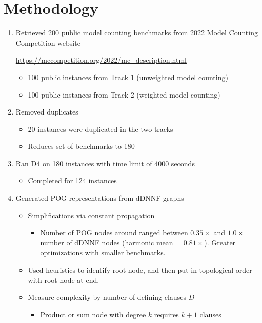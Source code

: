 \documentclass[letterpaper,USenglish,cleveref, autoref, thm-restate]{lipics-v2021}
\begin{document}
\section*{Methodology}
\begin{enumerate}
   \item Retrieved 200 public model counting benchmarks from 2022 Model Counting Competition website
     \begin{center}
       \url{https://mccompetition.org/2022/mc_description.html}
     \end{center}
     \begin{itemize}
     \item 100 public instances from Track 1 (unweighted model counting)
     \item 100 public instances from Track 2 (weighted model counting)
     \end{itemize}
   \item Removed duplicates
     \begin{itemize}
    \item  20 instances were duplicated in the two tracks
     \item Reduces set of benchmarks to 180
     \end{itemize}
   \item Ran D4 on 180 instances with time limit of 4000 seconds
     \begin{itemize}
     \item Completed for 124 instances
     \end{itemize}
   \item Generated POG representations from dDNNF graphs
     \begin{itemize}
     \item Simplifications via constant propagation
       \begin{itemize}
       \item Number of POG nodes around ranged between $0.35\times$
         and $1.0\times$ number of dDNNF nodes (harmonic mean =
         $0.81\times$).  Greater optimizations with smaller
         benchmarks.
       \end{itemize}
     \item Used heuristics to identify root node, and then put in topological order with root node at end.
     \item Measure complexity by number of defining clauses $D$
       \begin{itemize}
       \item Product or sum node with degree $k$ requires $k+1$ clauses

\end{itemize}
\end{itemize}
\end{enumerate}
\end{document}

